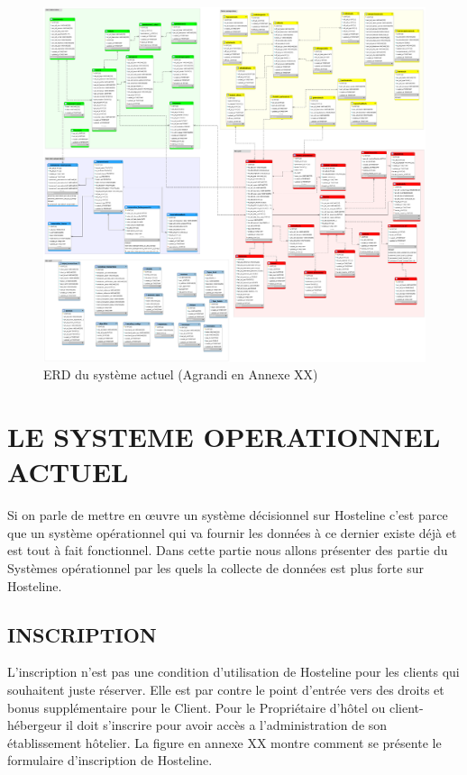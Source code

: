 \begin{figure}[!htbp]
	\begin{center}
		\includegraphics[scale=0.17]{images/diag_erd.png}
		\caption{ERD du système actuel (Agrandi en Annexe XX)}
		\label{classe_diagramme}
	\end{center}
\end{figure}

\cleardoublepage

\section{LE SYSTEME OPERATIONNEL ACTUEL}

Si on parle de mettre en œuvre un système décisionnel sur Hosteline c’est parce que un système opérationnel qui va fournir les données à ce dernier existe déjà et est tout à fait fonctionnel. Dans cette partie nous allons présenter des partie du Systèmes opérationnel par les quels la collecte de données est plus forte sur Hosteline.

\subsection{INSCRIPTION}	
L’inscription n’est pas une condition d’utilisation de Hosteline pour les clients qui souhaitent juste réserver. Elle est par contre le point d’entrée vers des droits et bonus supplémentaire pour le Client. Pour le Propriétaire d’hôtel ou client-hébergeur il doit s’inscrire pour avoir accès a l’administration de son établissement hôtelier. La figure en annexe XX montre comment se présente le formulaire d’inscription de Hosteline.

